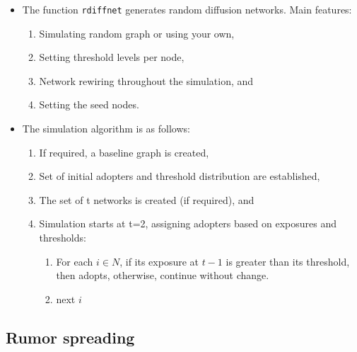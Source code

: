 \documentclass[]{book}
\begin{document}
\begin{itemize}
\item
  The function \texttt{rdiffnet} generates random diffusion networks. Main features:

  \begin{enumerate}
  \def\labelenumi{\arabic{enumi}.}
  \item
    Simulating random graph or using your own,
  \item
    Setting threshold levels per node,
  \item
    Network rewiring throughout the simulation, and
  \item
    Setting the seed nodes.
  \end{enumerate}
\item
  The simulation algorithm is as follows:

  \begin{enumerate}
  \def\labelenumi{\arabic{enumi}.}
  \item
    If required, a baseline graph is created,
  \item
    Set of initial adopters and threshold distribution are established,
  \item
    The set of t networks is created (if required), and
  \item
    Simulation starts at t=2, assigning adopters based on exposures and thresholds:

    \begin{enumerate}
    \def\labelenumii{\alph{enumii}.}
    \item
      For each \(i \in N\), if its exposure at \(t-1\) is greater than its threshold, then
      adopts, otherwise, continue without change.
    \item
      next \(i\)
    \end{enumerate}
  \end{enumerate}
\end{itemize}

\hypertarget{rumor-spreading}{%
\subsection{Rumor spreading}\label{rumor-spreading}}
\end{document}
